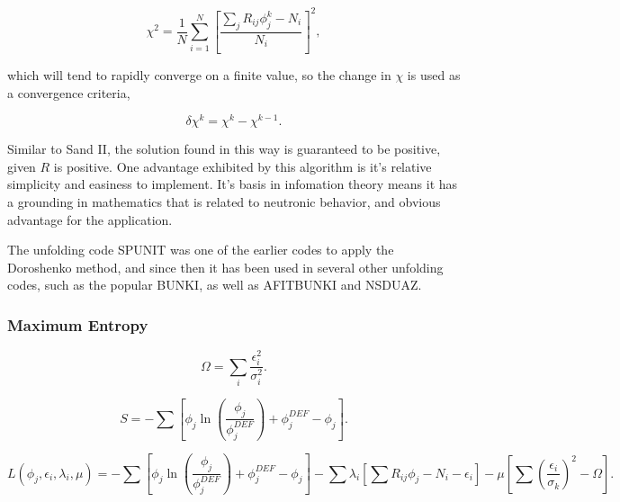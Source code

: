 \begin{equation}\label{eqn:doroshenko-error}
\chi^2 = \frac{1}{N} \sum_{i=1}^N [\frac{\sum_j R_{ij} \phi_j^k - N_i}{N_i}]^2 ,
\end{equation}

which will tend to rapidly converge on a finite value, so the change in $\chi$ is used as a convergence criteria,

\begin{equation}\label{eqn:doroshenko-error-delta}
\delta \chi^k = \chi^k - \chi^{k-1} .
\end{equation}

Similar to Sand II, the solution found in this way is guaranteed to be positive, given $R$ is positive.
One advantage exhibited by this algorithm is it's relative simplicity and easiness to implement.
It's basis in infomation theory means it has a grounding in mathematics that is related to neutronic behavior, and obvious advantage for the application.

The unfolding code SPUNIT was one of the earlier codes to apply the Doroshenko method, and since then it has been used in several other unfolding codes, such as the popular BUNKI, as well as AFITBUNKI and NSDUAZ.




\subsubsection{Maximum Entropy}


\begin{equation}\label{eqn:maxed-omega}
\Omega = \sum_i \frac{\epsilon_i^2}{\sigma_i^2} .
\end{equation}

\begin{equation}\label{eqn:maxed-skilling}
S = - \sum [\phi_j \ln (\frac{\phi_j}{\phi_j^{DEF}}) + \phi_j^{DEF} - \phi_j] .
\end{equation}

\begin{equation}\label{eqn:maxed-lagrangian}
L(\phi_j, \epsilon_i, \lambda_i, \mu) = -\sum [\phi_j \ln (\frac{\phi_j}{\phi_j^{DEF}}) + \phi_j^{DEF} - \phi_j] - \sum \lambda_i [\sum R_{ij} \phi_j - N_i - \epsilon_i] - \mu [\sum (\frac{\epsilon_i}{\sigma_k})^2 - \Omega] .
\end{equation}

